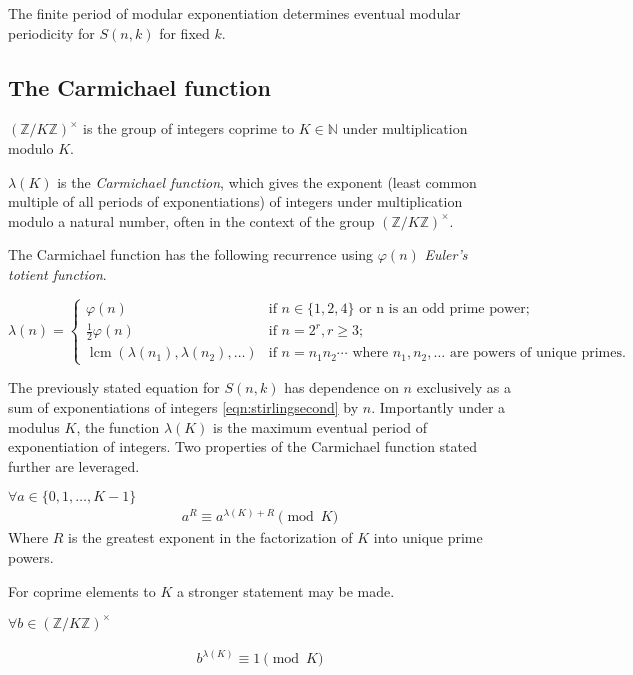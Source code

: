 \documentclass[12pt,reqno]{article}
\DeclareMathOperator{\lcm}{lcm}
\begin{document}
The finite period of modular exponentiation determines eventual modular periodicity for $S(n,k)$ for fixed $k$.

\subsection{The Carmichael function}
\begin{definition}
	$(\mathbb{Z}/K\mathbb{Z})^{\times}$ is the group of integers coprime to $K \in \mathbb{N}$ under multiplication modulo $K$.
\end{definition}
\begin{definition}
	$\lambda(K)$ is the {\em Carmichael function}, which gives the exponent (least common multiple of all periods of exponentiations) of integers under multiplication modulo a natural number, often in the context of the group $(\mathbb{Z}/K\mathbb{Z})^{\times}$.
\end{definition}

The Carmichael function has the following recurrence \cite{cc:carmichael} using $\varphi(n)$ {\em Euler's totient function}.

\begin{equation}
	\lambda(n) = \begin{cases}
		\varphi(n) & \text{if } n \in \{1,2,4\} \text{ or n is an odd prime power};
		\\
		\frac{1}{2}\varphi(n) & \text{if } n = 2^{r}, r \geq 3;
		\\
		\lcm (\lambda(n_{1}), \lambda(n_{2}), \ldots) & \text{if } n = n_{1}n_{2} \cdots \text{ where } n_{1}, n_{2}, \ldots \text{ are powers of unique primes.}
	\end{cases}\label{eqn:carmichaelrecur}
\end{equation}



The previously stated equation for $S(n,k)$ has dependence on $n$ exclusively as a sum of exponentiations of integers \eqref{eqn:stirlingsecond} by $n$. Importantly under a modulus $K$, the function $\lambda(K)$ is the maximum eventual period of exponentiation of integers. Two properties of the Carmichael function stated further are leveraged.
\begin{proposition}
	$\forall a \in \{0, 1, \ldots, K - 1\}$
	\begin{align}
		a^{R} \equiv a^{\lambda(K) + R} \pmod {K}
	\end{align}
	Where $R$ is the greatest exponent in the factorization of $K$ into unique prime powers.
\end{proposition}
For coprime elements to $K$ a stronger statement may be made.
\begin{proposition}
	$\forall b \in (\mathbb{Z}/K\mathbb{Z})^{\times}$

	\begin{align}
		b^{\lambda(K)} \equiv 1 \pmod {K}
	\end{align}
\end{proposition}
\end{document}
